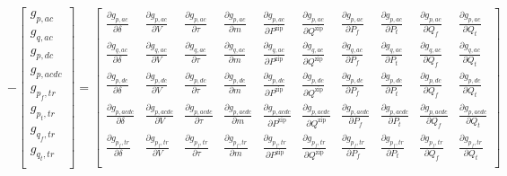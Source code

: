 \documentclass[11pt]{article}
\begin{document}
\begin{equation}
	-
	\begin{bmatrix}
		g_{p,ac} \\
		g_{q,ac} \\
		g_{p,dc} \\
		g_{p,acdc} \\
		g_{p_f,tr} \\
		g_{p_t,tr} \\
		g_{q_f,tr} \\
		g_{q_t,tr} \\
	\end{bmatrix} = 
	\begin{bmatrix}
		\frac{\partial g_{p,ac}}{\partial \delta} & \frac{\partial g_{p,ac}}{\partial V} & \frac{\partial g_{p,ac}}{\partial \tau} & \frac{\partial g_{p,ac}}{\partial m} & \frac{\partial g_{p,ac}}{\partial P^\text{zip}} & \frac{\partial g_{p,ac}}{\partial Q^\text{zip}} & \frac{\partial g_{p,ac}}{\partial P_f} & \frac{\partial g_{p,ac}}{\partial P_t} & \frac{\partial g_{p,ac}}{\partial Q_f} & \frac{\partial g_{p,ac}}{\partial Q_t} \\
		\frac{\partial g_{q,ac}}{\partial \delta} & \frac{\partial g_{q,ac}}{\partial V} & \frac{\partial g_{q,ac}}{\partial \tau} & \frac{\partial g_{q,ac}}{\partial m} & \frac{\partial g_{q,ac}}{\partial P^\text{zip}} & \frac{\partial g_{q,ac}}{\partial Q^\text{zip}} & \frac{\partial g_{q,ac}}{\partial P_f} & \frac{\partial g_{q,ac}}{\partial P_t} & \frac{\partial g_{q,ac}}{\partial Q_f} & \frac{\partial g_{q,ac}}{\partial Q_t} \\
		\frac{\partial g_{p,dc}}{\partial \delta} & \frac{\partial g_{p,dc}}{\partial V} & \frac{\partial g_{p,dc}}{\partial \tau} & \frac{\partial g_{p,dc}}{\partial m} & \frac{\partial g_{p,dc}}{\partial P^\text{zip}} & \frac{\partial g_{p,dc}}{\partial Q^\text{zip}} & \frac{\partial g_{p,dc}}{\partial P_f} & \frac{\partial g_{p,dc}}{\partial P_t} & \frac{\partial g_{p,dc}}{\partial Q_f} & \frac{\partial g_{p,dc}}{\partial Q_t} \\
		\frac{\partial g_{p,acdc}}{\partial \delta} & \frac{\partial g_{p,acdc}}{\partial V} & \frac{\partial g_{p,acdc}}{\partial \tau} & \frac{\partial g_{p,acdc}}{\partial m} & \frac{\partial g_{p,acdc}}{\partial P^\text{zip}} & \frac{\partial g_{p,acdc}}{\partial Q^\text{zip}} & \frac{\partial g_{p,acdc}}{\partial P_f} & \frac{\partial g_{p,acdc}}{\partial P_t} & \frac{\partial g_{p,acdc}}{\partial Q_f} & \frac{\partial g_{p,acdc}}{\partial Q_t} \\
		\frac{\partial g_{p_f,tr}}{\partial \delta} & \frac{\partial g_{p_f,tr}}{\partial V} & \frac{\partial g_{p_f,tr}}{\partial \tau} & \frac{\partial g_{p_f,tr}}{\partial m} & \frac{\partial g_{p_f,tr}}{\partial P^\text{zip}} & \frac{\partial g_{p_f,tr}}{\partial Q^\text{zip}} & \frac{\partial g_{p_f,tr}}{\partial P_f} & \frac{\partial g_{p_f,tr}}{\partial P_t} & \frac{\partial g_{p_f,tr}}{\partial Q_f} & \frac{\partial g_{p_f,tr}}{\partial Q_t} \\

\end{bmatrix}
\end{equation}
\end{document}
